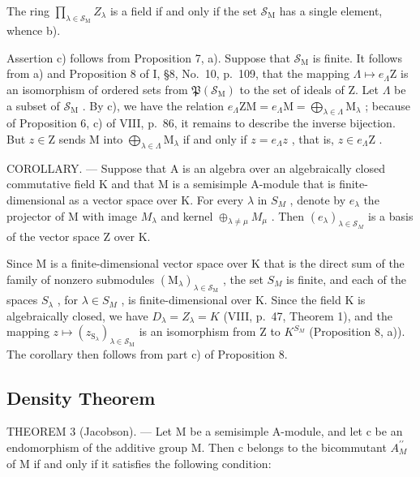 The ring \(\prod_{\lambda \in \mathcal{S}_{\mathrm{M}}}Z_{\lambda}\) is a field if and only if the set \(\mathcal{S}_{\mathrm{M}}\) has a single element, whence b).

Assertion c) follows from Proposition 7, a). Suppose that \(\mathcal{S}_{\mathrm{M}}\) is finite. It follows from a) and Proposition 8 of I, §8, No.~10, p.~109, that the mapping \(\Lambda \mapsto e_{\Lambda}\mathrm{Z}\) is an isomorphism of ordered sets from \(\mathfrak{P}(\mathcal{S}_{\mathrm{M}})\) to the set of ideals of Z. Let \(\Lambda\) be a subset of \(\mathcal{S}_{\mathrm{M}}\) . By c), we have the relation \(e_{\Lambda}\mathrm{ZM} = e_{\Lambda}\mathrm{M} = \bigoplus_{\lambda \in \Lambda}\mathrm{M}_{\lambda}\) ; because of Proposition 6, c) of VIII, p.~86, it remains to describe the inverse bijection. But \(z \in \mathrm{Z}\) sends M into \(\bigoplus_{\lambda \in \Lambda}\mathrm{M}_{\lambda}\) if and only if \(z = e_{\Lambda}z\) , that is, \(z \in e_{\Lambda}\mathrm{Z}\) .

COROLLARY. --- Suppose that A is an algebra over an algebraically closed commutative field K and that M is a semisimple A-module that is finite-dimensional as a vector space over K. For every \(\lambda\) in \(S_{M}\) , denote by \(e_{\lambda}\) the projector of M with image \(M_{\lambda}\) and kernel \(\oplus_{\lambda\neq\mu}M_{\mu}\) . Then \((e_{\lambda})_{\lambda\in\mathcal{S}_{M}}\) is a basis of the vector space Z over K.

Since M is a finite-dimensional vector space over K that is the direct sum of the family of nonzero submodules \((\mathrm{M}_{\lambda})_{\lambda\in\mathcal{S}_{\mathrm{M}}}\) , the set \(S_{M}\) is finite, and each of the spaces \(S_{\lambda}\) , for \(\lambda\in S_{M}\) , is finite-dimensional over K. Since the field K is algebraically closed, we have \(D_{\lambda}=Z_{\lambda}=K\) (VIII, p.~47, Theorem 1), and the mapping \(z\mapsto(z_{\mathrm{S}_{\lambda}})_{\lambda\in\mathcal{S}_{\mathrm{M}}}\) is an isomorphism from Z to \(K^{S_{M}}\) (Proposition 8, a)). The corollary then follows from part c) of Proposition 8.

\subsection{Density Theorem}

THEOREM 3 (Jacobson). --- Let M be a semisimple A-module, and let c be an endomorphism of the additive group M. Then c belongs to the bicommutant \(A_{M}^{\prime\prime}\) of M if and only if it satisfies the following condition:

